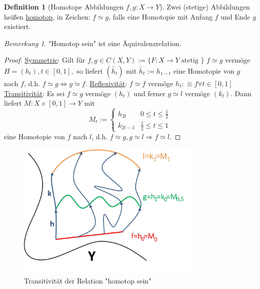 \documentclass[a4paper,11pt,notitlepage]{report}
\theoremstyle{remark}
\newtheorem{remark}{Bemerkung}[chapter]
\theoremstyle{definition}
\newtheorem{definition}{Definition}[chapter]
\begin{document}
\begin{definition}[Homotope Abbildungen $f,g \colon X \rightarrow Y$]
	Zwei (stetige) Abbildungen heißen \underline{homotop}, in Zeichen: $f \simeq g$, falls eine Homotopie mit Anfang $f$ und Ende $g$ existiert.
\end{definition}

\begin{remark}
"Homotop sein" ist eine Äquivalenzrelation.
\end{remark}

\begin{proof}
	\underline{Symmetrie}:
	Gilt für $f,g \in C(X,Y) := \{F \colon X \rightarrow Y \text{ stetig } \}$ $f \simeq g$ vermöge $H=(h_t), t \in [0,1],$ so liefert $(\tilde{h_t})$ mit $\tilde{h_t}:=h_{1-t}$ eine Homotopie von $g$ nach $f$, d.h. $f \simeq g \Leftrightarrow g \simeq f$.
	\newline
	\underline{Reflexivität}:
	$f \simeq f$ vermöge $h_t : \equiv f \forall t \in [0,1]$
	\newline
	\underline{Transitivität}:
	Es sei $f \simeq g$ vermöge $(h_t)$ und ferner $g \simeq l$ vermöge $(k_t)$.
	Dann liefert $M \colon X \times [0,1] \rightarrow Y$ mit
	$$M_t := \begin{cases} h_{2t} & 0 \leq t \leq \frac{1}{2} \\
	k_{2t-1} & \frac{1}{2} \leq t \leq 1
	\end{cases}$$
	eine Homotopie von $f$ nach $l$, d.h. $f \simeq g, g \simeq l \Rightarrow f \simeq l$.
\end{proof}

\begin{figure}[h]
\centering
\includegraphics[width=0.8\textwidth]{images/Homotopie_Transitivitaet.jpg}
\caption{Transitivität der Relation "homotop sein"}
\end{figure}
\end{document}
